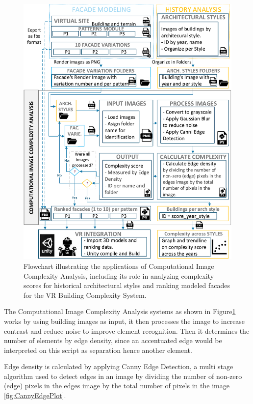     \begin{figure}[!htb]
      \centering
      \includegraphics[width= \linewidth, trim=0 0 0 0, clip]{Images/ImageComplexityAnalysisFlowchart}
      \caption{Flowchart illustrating the applications of Computational Image Complexity Analysis, including its role in analyzing complexity scores for historical architectural styles and ranking modeled facades for the VR Building Complexity System.}
      \label{fig:ImageComplexityAnalysisFlowchart}
    \end{figure}

The Computational Image Complexity Analysis systems as shown in Figure\ref{fig:ImageComplexityAnalysisFlowchart} works by using building images as input, it then processes the image to increase contrast and reduce noise to improve element recognition.
Then it determines the number of elements by edge density, since an accentuated edge would be interpreted on this script as separation hence another element.

Edge density is calculated by applying Canny Edge Detection\cite{OpenCV2023}, a multi stage algorithm used to detect edges in an image by dividing the number of non-zero (edge) pixels in the edges image by the total number of pixels in the image \ref{fig:CannyEdgePlot}.

